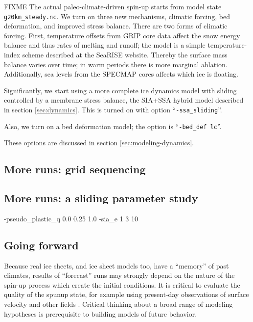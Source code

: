 FIXME The actual paleo-climate-driven spin-up starts from model state \texttt{g20km_steady.nc}.  We turn on three new mechanisms, climatic forcing, bed deformation, and improved stress balance.  There are two forms of climatic forcing. First, temperature offsets from GRIP core data affect the snow energy balance and thus rates of melting and runoff; the model is a simple temperature-index scheme described at the SeaRISE website.  Thereby the surface mass balance varies over time; in warm periods there is more marginal ablation.  Additionally, sea levels from the SPECMAP cores affects which ice is floating.

Significantly, we start using a more complete ice dynamics model with sliding controlled by a membrane stress balance, the SIA+SSA hybrid model described in section \ref{sec:dynamics}.  This is turned on with option ``\texttt{-ssa_sliding}''.

Also, we turn on a bed deformation model; the option is ``\texttt{-bed_def lc}''.  

These options are discussed in section \ref{sec:modeling-dynamics}.



\subsection{More runs: grid sequencing}  \label{subsect:gridseq}  

\subsection{More runs: a sliding parameter study}  \label{subsect:paramstudy}

-pseudo_plastic_q   0.0 0.25 1.0
-sia_e   1 3 10

\subsection{Going forward}  \label{subsect:forecastcaution}  Because real ice sheets, and ice sheet models too, have a ``memory'' of past climates, results of ``forecast'' runs may strongly depend on the nature of the spin-up process which create the initial conditions.  It is critical to evaluate the quality of the spunup state, for example using present-day observations of surface velocity and other fields \cite{AschwandenAdalgeirsdottirKhroulev}.  Critical thinking about a broad range of modeling hypotheses is prerequisite to building models of future behavior.


